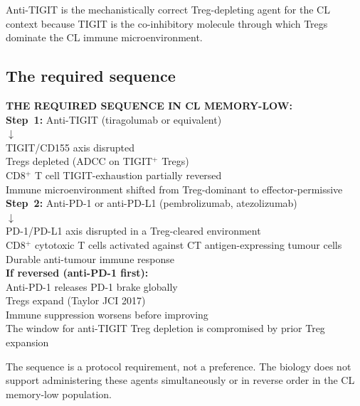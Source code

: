 \documentclass[12pt, a4paper]{article}
\begin{document}
Anti-TIGIT is the mechanistically correct Treg-depleting
agent for the CL context because TIGIT is the
co-inhibitory molecule through which Tregs dominate
the CL immune microenvironment.

\subsection{The required sequence}

\begin{center}
\colorbox{mechanismbox}{
\begin{minipage}{0.88\textwidth}
\vspace{0.5em}
\textbf{THE REQUIRED SEQUENCE IN CL MEMORY-LOW:}\\[0.5em]
\textbf{Step~1:} Anti-TIGIT (tiragolumab or
equivalent)\\
$\downarrow$\\
TIGIT/CD155 axis disrupted\\
Tregs depleted (ADCC on TIGIT$^+$ Tregs)\\
CD8$^+$ T cell TIGIT-exhaustion partially reversed\\
Immune microenvironment shifted from
Treg-dominant to effector-permissive\\[0.5em]
\textbf{Step~2:} Anti-PD-1 or anti-PD-L1
(pembrolizumab, atezolizumab)\\
$\downarrow$\\
PD-1/PD-L1 axis disrupted in a Treg-cleared
environment\\
CD8$^+$ cytotoxic T cells activated against
CT antigen-expressing tumour cells\\
Durable anti-tumour immune response\\[0.5em]
\textbf{If reversed (anti-PD-1 first):}\\
Anti-PD-1 releases PD-1 brake globally\\
Tregs expand (Taylor JCI 2017)\\
Immune suppression worsens before improving\\
The window for anti-TIGIT Treg depletion is
compromised by prior Treg expansion
\vspace{0.5em}
\end{minipage}}
\end{center}

\noindent The sequence is a protocol requirement, not
a preference. The biology does not support
administering these agents simultaneously or in
reverse order in the CL memory-low population.
\end{document}
